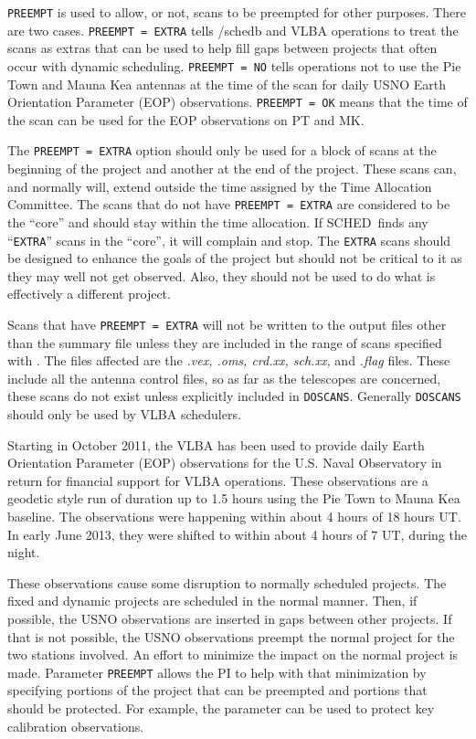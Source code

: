 \documentclass{report}
\newcommand{\schedb}{{\sc SCHED~}}
\begin{document}
{\tt PREEMPT} is used to allow, or not, scans to be preempted
for other purposes.  There are two cases.  {\tt PREEMPT = EXTRA}
tells /schedb and VLBA operations to treat the scans as extras
that can be used to help fill gaps between projects that often
occur with dynamic scheduling.  {\tt PREEMPT = NO} tells
operations not to use the Pie Town and Mauna Kea antennas at
the time of the scan for daily USNO Earth Orientation Parameter
(EOP) observations.  {\tt PREEMPT = OK} means that the time of
the scan can be used for the EOP observations on PT and MK.

The {\tt PREEMPT = EXTRA} option should only be used for a block of
scans at the beginning of the project and another at the end of the
project.  These scans can, and normally will, extend outside the time
assigned by the Time Allocation Committee.  The scans that do not have
{\tt PREEMPT = EXTRA} are considered to be the ``core'' and should
stay within the time allocation.  If \schedb finds any ``{\tt EXTRA}''
scans in the ``core'', it will complain and stop.  The {\tt EXTRA}
scans should be designed to enhance the goals of the project but
should not be critical to it as they may well not get observed.  Also,
they should not be used to do what is effectively a different project.

Scans that have {\tt PREEMPT = EXTRA} will not be written to the
output files other than the summary file unless they are included in
the range of scans specified with .
The files affected are the {\sl .vex, .oms, crd.xx, sch.xx,} and {\sl
.flag} files.  These include all the antenna control files, so as far
as the telescopes are concerned, these scans do not exist unless
explicitly included in {\tt DOSCANS}.  Generally {\tt DOSCANS} should
only be used by VLBA schedulers.

Starting in October 2011, the VLBA has been used to provide daily
Earth Orientation Parameter (EOP) observations for the U.S. Naval
Observatory in return for financial support for VLBA operations.
These observations are a geodetic style run of duration up to 1.5
hours using the Pie Town to Mauna Kea baseline.  The observations were
happening within about 4 hours of 18 hours UT.  In early June 2013,
they were shifted to within about 4 hours of 7 UT, during the night.

These observations cause some disruption to normally scheduled
projects.  The fixed and dynamic projects are scheduled in the
normal manner.  Then, if possible, the USNO observations are
inserted in gaps between other projects.  If that is not possible,
the USNO observations preempt the normal project for the two
stations involved.  An effort to minimize the impact on the normal
project is made.  Parameter {\tt PREEMPT} allows the PI to
help with that minimization by specifying portions of the project
that can be preempted and portions that should be protected.  For
example, the parameter can be used to protect key calibration
observations.
\end{document}
